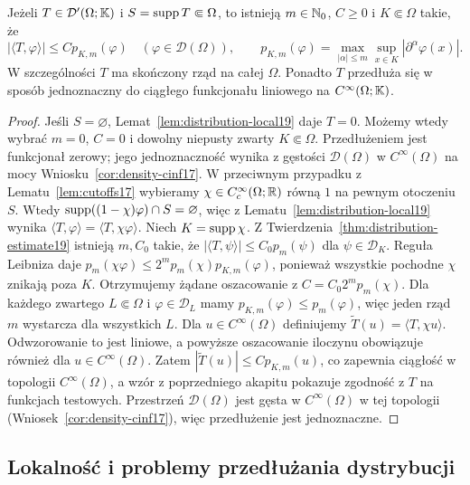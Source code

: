 \begin{twierdzenie}
\label{thm:compact-support-order19}
Jeżeli $T\in\mathcal D'(\Omega;\mathbb K)$ i
$S=\operatorname{supp} T\Subset\Omega$, to istnieją
$m\in\mathbb N_0$, $C\ge0$ i $K\Subset\Omega$ takie, że
\[|\langle T,\varphi\rangle|\le C p_{K,m}(\varphi)
\quad(\varphi\in\mathcal D(\Omega)),\qquad
p_{K,m}(\varphi)=\max_{|\alpha|\le m}
\sup_{x\in K}|\partial^\alpha\varphi(x)|.\]
W szczególności $T$ ma skończony rząd na całej $\Omega$.
Ponadto $T$ przedłuża się w sposób jednoznaczny do
ciągłego funkcjonału liniowego na $C^\infty(\Omega;\mathbb K)$.
\end{twierdzenie}
\begin{proof}
Jeśli $S=\varnothing$, Lemat~\ref{lem:distribution-local19}
daje $T=0$. Możemy wtedy wybrać $m=0$, $C=0$
i dowolny niepusty zwarty $K\Subset\Omega$.
Przedłużeniem jest funkcjonał zerowy; jego jednoznaczność
wynika z gęstości $\mathcal D(\Omega)$ w $C^\infty(\Omega)$
na mocy Wniosku~\ref{cor:density-cinf17}.
W przeciwnym przypadku z Lematu~\ref{lem:cutoffs17}
wybieramy $\chi\in C_c^\infty(\Omega;\mathbb R)$ równą $1$
na pewnym otoczeniu $S$. Wtedy
$\operatorname{supp}((1-\chi)\varphi)\cap S=\varnothing$, więc z
Lematu~\ref{lem:distribution-local19} wynika
$\langle T,\varphi\rangle=\langle T,\chi\varphi\rangle$.
Niech $K=\operatorname{supp}\chi$. Z Twierdzenia~\ref{thm:distribution-estimate19}
istnieją $m,C_0$ takie, że
$|\langle T,\psi\rangle|\le C_0p_m(\psi)$ dla
$\psi\in\mathcal D_K$. Reguła Leibniza daje
$p_m(\chi\varphi)\le 2^m p_m(\chi)p_{K,m}(\varphi)$,
ponieważ wszystkie pochodne $\chi$ znikają poza $K$.
Otrzymujemy żądane oszacowanie z $C=C_0 2^m p_m(\chi)$.
Dla każdego zwartego $L\Subset\Omega$ i $\varphi\in\mathcal D_L$
mamy $p_{K,m}(\varphi)\le p_m(\varphi)$,
więc jeden rząd $m$ wystarcza dla wszystkich $L$.
Dla $u\in C^\infty(\Omega)$ definiujemy
$\widetilde T(u)=\langle T,\chi u\rangle$.
Odwzorowanie to jest liniowe, a powyższe oszacowanie
iloczynu obowiązuje również dla $u\in C^\infty(\Omega)$.
Zatem $|\widetilde T(u)|\le C p_{K,m}(u)$,
co zapewnia ciągłość w topologii $C^\infty(\Omega)$, a wzór z poprzedniego akapitu
pokazuje zgodność z $T$ na funkcjach testowych.
Przestrzeń $\mathcal D(\Omega)$ jest gęsta w
$C^\infty(\Omega)$ w tej topologii (Wniosek~\ref{cor:density-cinf17}),
więc przedłużenie jest jednoznaczne.
\end{proof}

\subsection{Lokalność i problemy przedłużania dystrybucji}

